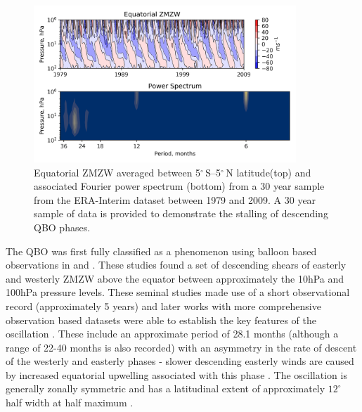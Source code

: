 {\begin{figure}[h!]
\centering
    \includegraphics[width=0.88\textwidth]{Figures/Figures-background/QBO_SAO_ERA.png}
    \caption[Equatorial ZMZW and associated Fourier power spectrum from ERA-Interim.]{Equatorial ZMZW averaged between 5$^{\circ}$\,S--5$^{\circ}$\,N latitude(top) and associated Fourier power spectrum (bottom) from a 30 year sample from the ERA-Interim dataset between 1979 and 2009. A 30 year sample of data is provided to demonstrate the stalling of descending QBO phases.}
    \label{fig:QBO_SAO_ERA}
\centering
\end{figure}

The QBO was first fully classified as a phenomenon using balloon based observations in \cite{Ebdon1960} and \cite{Reed1964}. These studies found a set of descending shears of easterly and westerly ZMZW above the equator between approximately the 10hPa and 100hPa pressure levels. These seminal studies made use of a short observational record (approximately 5 years) and later works with more comprehensive observation based datasets were able to establish the key features of the oscillation \citep{Baldwin2001,pascoeQuasibiennial2005}. These include an approximate period of 28.1 months (although a range of 22-40 months is also recorded) with an asymmetry in the rate of descent of the westerly and easterly phases - slower descending easterly winds are caused by increased equatorial upwelling associated with this phase \citep{pascoeQuasibiennial2005}. The oscillation is generally zonally symmetric \citep{BELMONT1968} and has a latitudinal extent of approximately $12^{\circ}$ half width at half maximum \citep{Baldwin2001}.

}
